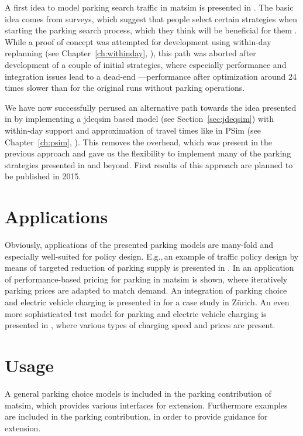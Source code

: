 A first idea to model parking search traffic in \gls{matsim} is presented in \citet[][]{Waraich_unpub_IATBR_2012}. The basic idea comes from surveys, which suggest that people select certain strategies when starting the parking search process, which they think will be beneficial for them \citet[][]{AxhausenPolak_1989}. While a proof of concept was attempted for development using within-day replanning (see Chapter~\ref{ch:withinday}, \citep[][]{DoblerEtAl_TRR_2012}), this path was aborted after development of a couple of initial strategies, where especially performance and integration issues lead to a dead-end \citet[][]{WaraichEtAl_unpub_TRB_2013}---performance after optimization around 24\,times slower than for the original runs without parking operations. 

We have now successfully perused an alternative path towards the idea presented in \citet[][]{Waraich_unpub_IATBR_2012} by implementing a \gls{jdeqsim} based model (see Section~\ref{sec:jdeqsim}) with within-day support and approximation of travel times like in PSim (see Chapter~\ref{ch:psim}, \citet[][]{FourieEtAl_TRR_2013}). This removes the overhead, which was present in the previous approach and gave us the flexibility to implement many of the parking strategies presented in \citet[][]{AxhausenPolak_1989} and beyond. First results of this approach are planned to be published in 2015.

\section{Applications}
Obviously, applications of the presented parking models are many-fold and especially well-suited for policy design. E.g.,\,an example of traffic policy design by means of targeted reduction of parking supply is presented in \citet[][]{WaraichAxhausen_TRR_2012}. In \citet[][]{WaraichEtAl_unpub_TRB_2013} an application of performance-based pricing for parking in \gls{matsim} is shown, where iteratively parking prices are adapted to match demand. An integration of parking choice and electric vehicle charging is presented in \citet[][]{WaraichEtAl_JanssensEtAl_2014} for a case study in Zürich. An even more sophisticated test model for parking and electric vehicle charging is presented in \citet[][]{BemetzHohenfellner_BSCThesis_2014}, where various types of charging speed and prices are present.

\section{Usage}
A general parking choice models is included in the parking contribution of \gls{matsim}, which provides various interfaces for extension. Furthermore examples are included in the parking contribution, in order to provide guidance for extension. 



